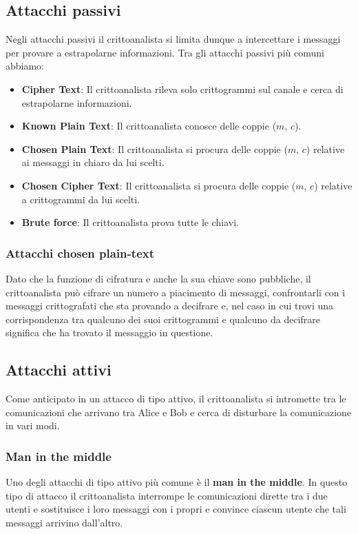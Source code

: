 \subsection{Attacchi passivi}
Negli attacchi passivi il crittoanalista si limita dunque a intercettare i messaggi per provare a estrapolarne
informazioni. Tra gli attacchi passivi pi\`u comuni abbiamo:
\begin{itemize}
	\item \textbf{Cipher Text}: Il crittoanalista rileva solo crittogrammi sul canale e cerca di estrapolarne informazioni.
	\item \textbf{Known Plain Text}: Il crittoanalista conosce delle coppie ($m$, $c$).
	\item \textbf{Chosen Plain Text}: Il crittoanalista si procura delle coppie ($m$, $c$) relative
	      ai messaggi in chiaro da lui scelti.
	\item \textbf{Chosen Cipher Text}: Il crittoanalista si procura delle coppie ($m$, $c$) relative a crittogrammi
	      da lui scelti.
	\item \textbf{Brute force}: Il crittoanalista prova tutte le chiavi.
\end{itemize}

\subsubsection{Attacchi chosen plain-text}
Dato che la funzione di cifratura e anche la sua chiave sono pubbliche, il crittoanalista pu\`o cifrare un numero a
piacimento di messaggi, confrontarli con i messaggi crittografati che sta provando a decifrare e, nel caso in cui
trovi una corrispondenza tra qualcuno dei suoi crittogrammi e qualcuno da decifrare significa che ha trovato il
messaggio in questione.

\subsection{Attacchi attivi}
Come anticipato in un attacco di tipo attivo, il crittoanalista si intromette tra le comunicazioni che arrivano tra
Alice e Bob e cerca di disturbare la comunicazione in vari modi.

\subsubsection{Man in the middle}
Uno degli attacchi di tipo attivo pi\`u comune \`e il \textbf{man in the middle}. In questo tipo di attacco il
crittoanalista interrompe le comunicazioni dirette tra i due utenti e sostituisce i loro messaggi con i propri e convince
ciascun utente che tali messaggi arrivino dall'altro.